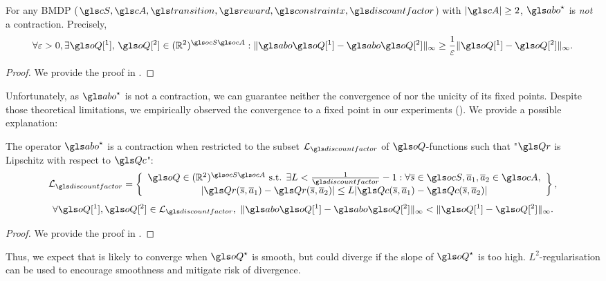 \begin{theorem}
	\begin{leftbar}[theorembar]
	\label{thm:contraction}
	For any \gls{BMDP} ($\cS,\cA,\Ps,\R,\constraint,\discountfactor$) with $|\cA| \geq 2$, $\abo^{\star}$ is \emph{not} a contraction. Precisely, $$\forall\epsilon>0, \exists \oQ[^1],\,\oQ[^2]\in(\Real^2)^{\ocS\ocA}:\|\abo \oQ[^1]-\abo \oQ[^2]\|_\infty \geq \frac{1}{\epsilon}\|\oQ[^1] - \oQ[^2]\|_\infty.$$
	\end{leftbar}
\end{theorem}
\begin{proof}
	We provide the proof in .
\end{proof}

Unfortunately, as $\abo^{\star}$ is not a contraction, we can guarantee neither the convergence of  nor the unicity of its fixed points. Despite those theoretical limitations, we empirically observed the convergence to a fixed point in our experiments (). We provide a possible explanation:

\begin{theorem}
	\begin{leftbar}[theorembar]
	\label{thm:contractivity-smooth}
	The operator $\abo^{\star}$ is a contraction when restricted to the subset $\cL_{\discountfactor}$ of $\oQ$-functions such that "$\Qr$ is Lipschitz with respect to $\Qc$":
	\begin{equation}
	\cL_\discount = \left\{\begin{array}{cc}
	\oQ\in(\Real^2)^{\ocS\ocA}\text{ s.t. }\exists L<\frac{1}{\discount}-1: \forall \os\in\ocS,\oa_1,\oa_2\in\ocA,   \\
	|\Qr(\os,\oa_1) - \Qr(\os,\oa_2)| \leq L|\Qc(\os,\oa_1) - \Qc(\os,\oa_2)|
	\end{array}\right\},
	\end{equation}
	\begin{equation*}
	\forall \oQ[^1],\oQ[^2]\in \cL_\discount,\; \|\abo \oQ[^1]- \abo \oQ[^2]\|_\infty  < \|\oQ[^1]-\oQ[^2]\|_\infty.
	\end{equation*}
	\end{leftbar}
\end{theorem}
\begin{proof}
	We provide the proof in .
\end{proof}

Thus, we expect that  is likely to converge when $\oQ^{\star}$ is smooth, but could diverge if the slope of $\oQ^{\star}$ is too high.  $L^2$-regularisation can be used to encourage smoothness and mitigate risk of divergence.


